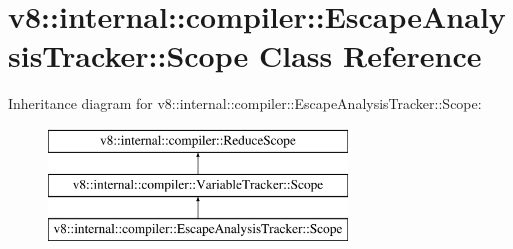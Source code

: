 \hypertarget{classv8_1_1internal_1_1compiler_1_1EscapeAnalysisTracker_1_1Scope}{}\section{v8\+:\+:internal\+:\+:compiler\+:\+:Escape\+Analysis\+Tracker\+:\+:Scope Class Reference}
\label{classv8_1_1internal_1_1compiler_1_1EscapeAnalysisTracker_1_1Scope}
Inheritance diagram for v8\+:\+:internal\+:\+:compiler\+:\+:Escape\+Analysis\+Tracker\+:\+:Scope\+:\begin{figure}[H]
\begin{center}
\leavevmode
\includegraphics[height=3.000000cm]{classv8_1_1internal_1_1compiler_1_1EscapeAnalysisTracker_1_1Scope}
\end{center}
\end{figure}
